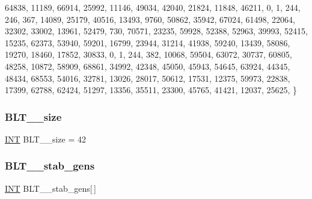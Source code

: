 \begin{DoxyCode}
      64838, 11189, 66914, 25992, 11146, 49034, 42040, 21824, 11848, 46211, 
    0, 1, 244, 246, 367, 14089, 25179, 40516, 13493, 9760, 50862, 35942, 67024, 61498, 22064, 32302, 33002,
       13961, 52479, 730, 70571, 23235, 59928, 52388, 52963, 39993, 52415, 15235, 62373, 53940, 59201, 16799, 
      23944, 31214, 41938, 59240, 13439, 58086, 19270, 18460, 17852, 30833, 
    0, 1, 244, 382, 10068, 59504, 63072, 30737, 60805, 48258, 10872, 58909, 68861, 34992, 42348, 45050, 
      45943, 54645, 63924, 44345, 48434, 68553, 54016, 32781, 13026, 28017, 50612, 17531, 12375, 59973, 22838, 17399,
       62788, 62424, 51297, 13356, 35511, 23300, 45765, 41421, 12037, 25625, 
\}
\end{DoxyCode}
\mbox{\label{data___b_l_t_8_c_a74802ccd535665185ad472ca01449553}} 
\subsubsection{\texorpdfstring{B\+L\+T\+\_\+\_\+size}{BLT\_41\_size}}
{\footnotesize\ttfamily \mbox{\hyperlink{galois_8h_a09fddde158a3a20bd2dcadb609de11dc}{I\+NT}} B\+L\+T\+\_\+\_\+size = 42}

\mbox{\label{data___b_l_t_8_c_a8ea154f34ad8d2e91b446c6f6d5ff299}} 
\subsubsection{\texorpdfstring{B\+L\+T\+\_\+\_\+stab\+\_\+gens}{BLT\_41\_stab\_gens}}
{\footnotesize\ttfamily \mbox{\hyperlink{galois_8h_a09fddde158a3a20bd2dcadb609de11dc}{I\+NT}} B\+L\+T\+\_\+\_\+stab\+\_\+gens\mbox{[}$\,$\mbox{]}}

\mbox{\label{data___b_l_t_8_c_a96479435bd43c77e54ee2e0ac3c92a30}} 

